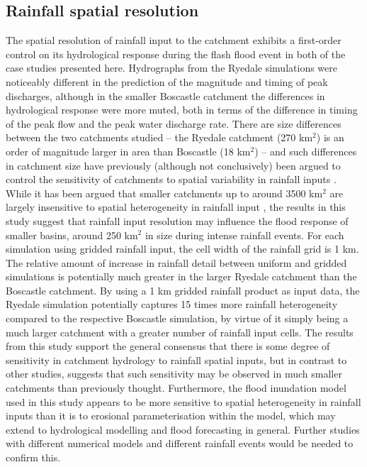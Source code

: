 \subsection{Rainfall spatial resolution}
The spatial resolution of rainfall input to the catchment exhibits a first-order control on its hydrological response during the flash flood event in both of the case studies presented here. Hydrographs from the Ryedale simulations were noticeably different in the prediction of the magnitude and timing of peak discharges, although in the smaller Boscastle catchment the differences in hydrological response were more muted, both in terms of the difference in timing of the peak flow and the peak water discharge rate. There are size differences between the two catchments studied -- the Ryedale catchment (270 km\(^2\)) is an order of magnitude larger in area than Boscastle (18 km\(^2\)) -- and such differences in catchment size have previously (although not conclusively) been argued to control the sensitivity of catchments to spatial variability in rainfall inputs \citep{krajewski1991monte,nicotina2008impact}. While it has been argued that smaller catchments up to around 3500 km\(^2\) are largely insensitive to spatial heterogeneity in rainfall input \citep{nicotina2008impact}, the results in this study suggest that rainfall input resolution may influence the flood response of smaller basins, around 250 km\(^2\) in size during intense rainfall events. For each simulation using gridded rainfall input, the cell width of the rainfall grid is 1 km. The relative amount of increase in rainfall detail between uniform and gridded simulations is potentially much greater in the larger Ryedale catchment than the Boscastle catchment. By using a 1 km gridded rainfall product as input data, the Ryedale simulation potentially captures 15 times more rainfall heterogeneity compared to the respective Boscastle simulation, by virtue of it simply being a much larger catchment with a greater number of rainfall input cells. The results from this study support the general consensus that there is some degree of sensitivity in catchment hydrology to rainfall spatial inputs, but in contrast to other studies, suggests that such sensitivity may be observed in much smaller catchments than previously thought. Furthermore, the flood inundation model used in this study appears to be more sensitive to spatial heterogeneity in rainfall inputs than it is to erosional parameterisation within the model, which may extend to hydrological modelling and flood forecasting in general. Further studies with different numerical models and different rainfall events would be needed to confirm this. 


